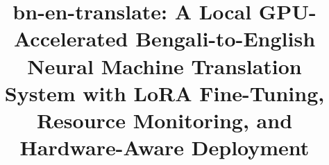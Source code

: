 \documentclass[conference]{IEEEtran}
\begin{document}

\title{bn-en-translate: A Local GPU-Accelerated Bengali-to-English Neural
Machine Translation System with LoRA Fine-Tuning, Resource Monitoring,
and Hardware-Aware Deployment}

\author{
}

\maketitle

\end{document}
